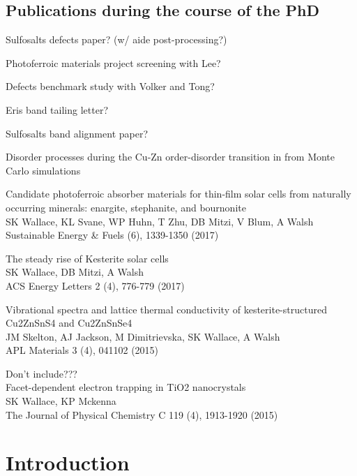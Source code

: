 \documentclass[11pt, twoside]{report}
\begin{document}
\section*{Publications during the course of the PhD}
\begin{etaremune}
\item Sulfosalts defects paper? (w/ aide post-processing?)
\item Photoferroic materials project screening with Lee?
\item Defects benchmark study with Volker and Tong?
\item Eris band tailing letter?
\item Sulfosalts band alignment paper?
\item Disorder processes during the Cu-Zn order-disorder transition in {\CZTS} from Monte Carlo simulations
\item Candidate photoferroic absorber materials for thin-film solar cells from naturally occurring minerals: enargite, stephanite, and bournonite\\
SK Wallace, KL Svane, WP Huhn, T Zhu, DB Mitzi, V Blum, A Walsh\\ Sustainable Energy \& Fuels  (6), 1339-1350 (2017)
\item The steady rise of Kesterite solar cells\\ SK Wallace, DB Mitzi, A Walsh\\ ACS Energy Letters 2 (4), 776-779 (2017)
\item Vibrational spectra and lattice thermal conductivity of kesterite-structured Cu2ZnSnS4 and Cu2ZnSnSe4\\ JM Skelton, AJ Jackson, M Dimitrievska, SK Wallace, A Walsh\\ APL Materials 3 (4), 041102 (2015)
\item Don't include???\\ Facet-dependent electron trapping in TiO2 nanocrystals\\ SK Wallace, KP Mckenna\\ The Journal of Physical Chemistry C 119 (4), 1913-1920 (2015)
\end{etaremune}


\tableofcontents
{}
\listoffigures
{}
\listoftables
{}



\chapter{Introduction}
\setcounter{page}{1}
\end{document}
